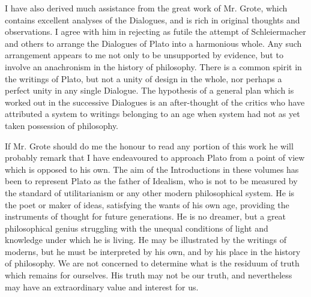 \documentclass[11pt,letter]{article}
\begin{document}
\par  I have also derived much assistance from the great work of Mr. Grote, which contains excellent analyses of the Dialogues, and is rich in original thoughts and observations. I agree with him in rejecting as futile the attempt of Schleiermacher and others to arrange the Dialogues of Plato into a harmonious whole. Any such arrangement appears to me not only to be unsupported by evidence, but to involve an anachronism in the history of philosophy. There is a common spirit in the writings of Plato, but not a unity of design in the whole, nor perhaps a perfect unity in any single Dialogue. The hypothesis of a general plan which is worked out in the successive Dialogues is an after-thought of the critics who have attributed a system to writings belonging to an age when system had not as yet taken possession of philosophy.

\par  If Mr. Grote should do me the honour to read any portion of this work he will probably remark that I have endeavoured to approach Plato from a point of view which is opposed to his own. The aim of the Introductions in these volumes has been to represent Plato as the father of Idealism, who is not to be measured by the standard of utilitarianism or any other modern philosophical system. He is the poet or maker of ideas, satisfying the wants of his own age, providing the instruments of thought for future generations. He is no dreamer, but a great philosophical genius struggling with the unequal conditions of light and knowledge under which he is living. He may be illustrated by the writings of moderns, but he must be interpreted by his own, and by his place in the history of philosophy. We are not concerned to determine what is the residuum of truth which remains for ourselves. His truth may not be our truth, and nevertheless may have an extraordinary value and interest for us.
\end{document}
